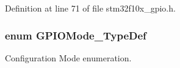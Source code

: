 Definition at line 71 of file stm32f10x\+\_\+gpio.\+h.

\subsubsection[{\texorpdfstring{G\+P\+I\+O\+Mode\+\_\+\+Type\+Def}{GPIOMode_TypeDef}}]{\setlength{\rightskip}{0pt plus 5cm}enum {\bf G\+P\+I\+O\+Mode\+\_\+\+Type\+Def}}\hypertarget{group___g_p_i_o___exported___types_ga1347339e1c84a196fabbb31205eec5d4}{}\label{group___g_p_i_o___exported___types_ga1347339e1c84a196fabbb31205eec5d4}


Configuration Mode enumeration. 

